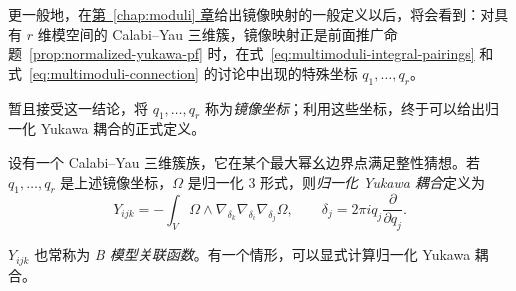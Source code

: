 更一般地，在\hyperref[chap:moduli]{第~\ref*{chap:moduli} 章}给出镜像映射的一般定义以后，将会看到：对具有 $r$ 维模空间的 Calabi--Yau 三维簇，镜像映射正是前面推广命题~\ref{prop:normalized-yukawa-pf} 时，在式~\eqref{eq:multimoduli-integral-pairings} 和式~\eqref{eq:multimoduli-connection} 的讨论中出现的特殊坐标 $q_1,\ldots,q_r$。

暂且接受这一结论，将 $q_1,\ldots,q_r$ 称为\emph{镜像坐标}；利用这些坐标，终于可以给出归一化 Yukawa 耦合的正式定义。
\begin{definition}\label{def:normalized-yukawa}
设有一个 Calabi--Yau 三维簇族，它在某个最大幂幺边界点满足整性猜想。若 $q_1,\ldots,q_r$ 是上述镜像坐标，$\Omega$ 是归一化 $3$ 形式，则\emph{归一化 Yukawa 耦合}定义为
\[
Y_{ijk}=-\int_V\Omega\wedge\nabla_{\delta_k}\nabla_{\delta_i}\nabla_{\delta_j}\Omega,
\qquad \delta_j=2\pi i q_j\frac{\partial}{\partial q_j}.
\]
\end{definition}
$Y_{ijk}$ 也常称为 \emph{B 模型关联函数}。有一个情形，可以显式计算归一化 Yukawa 耦合。

